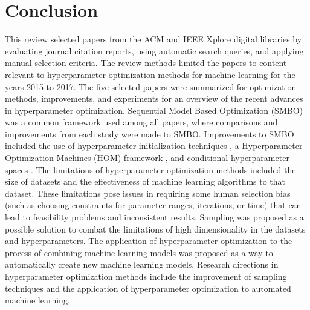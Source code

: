 

\section{Conclusion} \label{conclusion}

This review selected papers from the ACM and IEEE Xplore digital libraries by evaluating journal citation reports, using automatic search queries, and applying manual selection criteria. The review methods limited the papers to content relevant to hyperparameter optimization methods for machine learning for the years 2015 to 2017. The five selected papers were summarized for optimization methods, improvements, and experiments for an overview of the recent advances in hyperparameter optimization. Sequential Model Based Optimization (SMBO) was a common framework used among all papers, where comparisons and improvements from each study were made to SMBO. Improvements to SMBO included the use of hyperparameter initialization techniques \cite{Schilling:2015,Wistuba:2015}, a Hyperparameter Optimization Machines (HOM) framework \cite{Wistuba:2016}, and conditional hyperparameter spaces \cite{Levesque:2017}. The limitations of hyperparameter optimization methods included the size of datasets and the effectiveness of machine learning algorithms to that dataset. These limitations pose issues in requiring some human selection bias (such as choosing constraints for parameter ranges, iterations, or time) that can lead to feasibility problems and inconsistent results. Sampling was proposed as a possible solution to combat the limitations of high dimensionality in the datasets and hyperparameters. The application of hyperparameter optimization to the process of combining machine learning models was proposed as a way to automatically create new machine learning models. Research directions in hyperparameter optimization methods include the improvement of sampling techniques and the application of hyperparameter optimization to automated machine learning.

